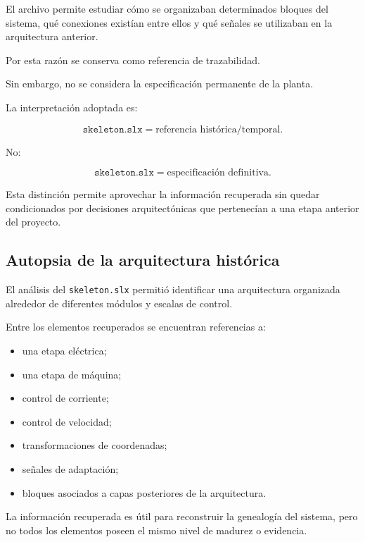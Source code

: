 El archivo permite estudiar cómo se organizaban determinados bloques del sistema, qué conexiones existían entre ellos y qué señales se utilizaban en la arquitectura anterior.

Por esta razón se conserva como referencia de trazabilidad.

Sin embargo, no se considera la especificación permanente de la planta.

La interpretación adoptada es:

\begin{equation}
\texttt{skeleton.slx}
=
\text{referencia histórica/temporal}.
\end{equation}

No:

\begin{equation}
\texttt{skeleton.slx}
=
\text{especificación definitiva}.
\end{equation}

Esta distinción permite aprovechar la información recuperada sin quedar condicionados por decisiones arquitectónicas que pertenecían a una etapa anterior del proyecto.

\subsection{Autopsia de la arquitectura histórica}

El análisis del \texttt{skeleton.slx} permitió identificar una arquitectura organizada alrededor de diferentes módulos y escalas de control.

Entre los elementos recuperados se encuentran referencias a:

\begin{itemize}
    \item una etapa eléctrica;
    \item una etapa de máquina;
    \item control de corriente;
    \item control de velocidad;
    \item transformaciones de coordenadas;
    \item señales de adaptación;
    \item bloques asociados a capas posteriores de la arquitectura.
\end{itemize}

La información recuperada es útil para reconstruir la genealogía del sistema, pero no todos los elementos poseen el mismo nivel de madurez o evidencia.

